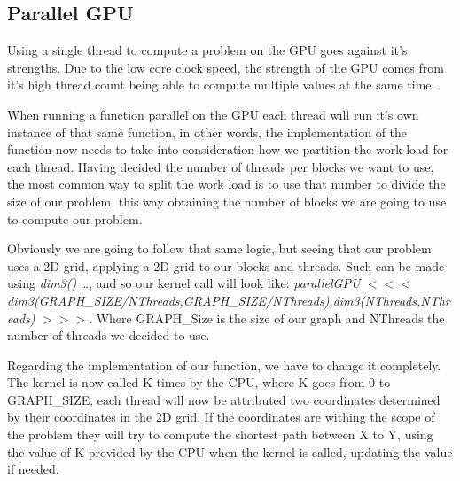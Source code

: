 \documentclass[runningheads]{llncs}
\begin{document}
\subsection{Parallel GPU}
Using a single thread to compute a problem on the GPU goes against it's strengths. 
Due to the low core clock speed, the strength of the GPU comes from it's high thread count being able to compute multiple values at the same time. 

When running a function parallel on the GPU each thread will run it's own instance of that same function, 
in other words, the implementation of the function now needs to take into consideration how we partition the work load for each thread. 
Having decided the number of threads per blocks we want to use, the most common way to split the work load is to 
use that number to divide the size of our problem, this way obtaining the number of blocks we are going to use to compute our problem. 

Obviously we are going to follow that same logic, but seeing that our problem uses a 2D grid, 
applying a 2D grid to our blocks and threads. Such can be made using \textit{dim3()} \dots, 
and so our kernel call will look like: \newline\small{\textit{parallelGPU}
\begin{math} <<< \end{math}
\textit{dim3(GRAPH\_SIZE/NThreads,GRAPH\_SIZE/NThreads),\newline dim3(NThreads,NThreads)}
\begin{math} >>> \end{math}}. \newline
Where GRAPH\_Size is the size of our graph and NThreads the number of threads we decided to use.

Regarding the implementation of our function, we have to change it completely.
The kernel is now called K times by the CPU, where K goes from 0 to GRAPH\_SIZE, 
each thread will now be attributed two coordinates determined by their coordinates in the 2D grid. 
If the coordinates are withing the scope of the problem they will try to compute the shortest path between X to Y, using the value of K provided by the CPU when the kernel is called, updating the value if needed. 
\end{document}
